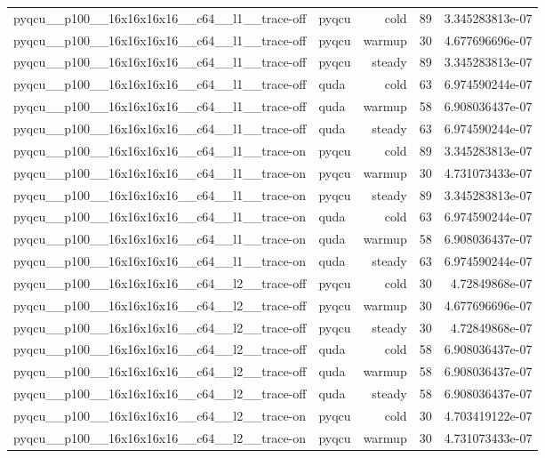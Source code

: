 \begin{table}[htbp]
\begin{tabular}{@{}llrrr@{}}
pyqcu\_\_p100\_\_16x16x16x16\_\_c64\_\_l1\_\_trace-off & pyqcu & cold & 89 & 3.345283813e-07 \\
pyqcu\_\_p100\_\_16x16x16x16\_\_c64\_\_l1\_\_trace-off & pyqcu & warmup & 30 & 4.677696696e-07 \\
pyqcu\_\_p100\_\_16x16x16x16\_\_c64\_\_l1\_\_trace-off & pyqcu & steady & 89 & 3.345283813e-07 \\
pyqcu\_\_p100\_\_16x16x16x16\_\_c64\_\_l1\_\_trace-off & quda & cold & 63 & 6.974590244e-07 \\
pyqcu\_\_p100\_\_16x16x16x16\_\_c64\_\_l1\_\_trace-off & quda & warmup & 58 & 6.908036437e-07 \\
pyqcu\_\_p100\_\_16x16x16x16\_\_c64\_\_l1\_\_trace-off & quda & steady & 63 & 6.974590244e-07 \\
pyqcu\_\_p100\_\_16x16x16x16\_\_c64\_\_l1\_\_trace-on & pyqcu & cold & 89 & 3.345283813e-07 \\
pyqcu\_\_p100\_\_16x16x16x16\_\_c64\_\_l1\_\_trace-on & pyqcu & warmup & 30 & 4.731073433e-07 \\
pyqcu\_\_p100\_\_16x16x16x16\_\_c64\_\_l1\_\_trace-on & pyqcu & steady & 89 & 3.345283813e-07 \\
pyqcu\_\_p100\_\_16x16x16x16\_\_c64\_\_l1\_\_trace-on & quda & cold & 63 & 6.974590244e-07 \\
pyqcu\_\_p100\_\_16x16x16x16\_\_c64\_\_l1\_\_trace-on & quda & warmup & 58 & 6.908036437e-07 \\
pyqcu\_\_p100\_\_16x16x16x16\_\_c64\_\_l1\_\_trace-on & quda & steady & 63 & 6.974590244e-07 \\
pyqcu\_\_p100\_\_16x16x16x16\_\_c64\_\_l2\_\_trace-off & pyqcu & cold & 30 & 4.72849868e-07 \\
pyqcu\_\_p100\_\_16x16x16x16\_\_c64\_\_l2\_\_trace-off & pyqcu & warmup & 30 & 4.677696696e-07 \\
pyqcu\_\_p100\_\_16x16x16x16\_\_c64\_\_l2\_\_trace-off & pyqcu & steady & 30 & 4.72849868e-07 \\
pyqcu\_\_p100\_\_16x16x16x16\_\_c64\_\_l2\_\_trace-off & quda & cold & 58 & 6.908036437e-07 \\
pyqcu\_\_p100\_\_16x16x16x16\_\_c64\_\_l2\_\_trace-off & quda & warmup & 58 & 6.908036437e-07 \\
pyqcu\_\_p100\_\_16x16x16x16\_\_c64\_\_l2\_\_trace-off & quda & steady & 58 & 6.908036437e-07 \\
pyqcu\_\_p100\_\_16x16x16x16\_\_c64\_\_l2\_\_trace-on & pyqcu & cold & 30 & 4.703419122e-07 \\
pyqcu\_\_p100\_\_16x16x16x16\_\_c64\_\_l2\_\_trace-on & pyqcu & warmup & 30 & 4.731073433e-07 \\

\end{tabular}
\end{table}
